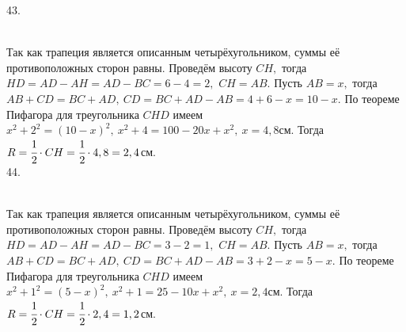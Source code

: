 \documentclass[12pt]{article}
\begin{document}
43. \begin{figure}[ht!]
\end{figure}\\
Так как трапеция является описанным четырёхугольником, суммы её противоположных сторон равны. Проведём высоту $CH,$ тогда $HD=AD-AH=AD-BC=6-4=2,$ $CH=AB.$ Пусть $AB=x,$ тогда $AB+CD=BC+AD,\ CD=BC+AD-AB=4+6-x=10-x.$ По теореме Пифагора для треугольника $CHD$ имеем $x^2+2^2=(10-x)^2,\ x^2+4=100-20x+x^2,\ x=4,8$см. Тогда $R=\cfrac{1}{2}\cdot CH=\cfrac{1}{2}\cdot 4,8=2,4$см.\\
44. \begin{figure}[ht!]
\end{figure}\\
Так как трапеция является описанным четырёхугольником, суммы её противоположных сторон равны. Проведём высоту $CH,$ тогда $HD=AD-AH=AD-BC=3-2=1,$ $CH=AB.$ Пусть $AB=x,$ тогда $AB+CD=BC+AD,\ CD=BC+AD-AB=3+2-x=5-x.$ По теореме Пифагора для треугольника $CHD$ имеем $x^2+1^2=(5-x)^2,\ x^2+1=25-10x+x^2,\ x=2,4$см. Тогда $R=\cfrac{1}{2}\cdot CH=\cfrac{1}{2}\cdot 2,4=1,2$см.\\
\end{document}
